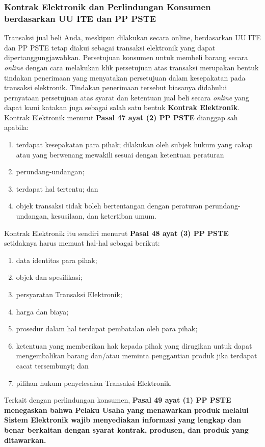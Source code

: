 \subsubsection{Kontrak Elektronik dan Perlindungan Konsumen berdasarkan UU ITE dan PP PSTE}
Transaksi jual beli Anda, meskipun dilakukan secara online, berdasarkan UU ITE dan PP PSTE tetap diakui sebagai transaksi elektronik yang dapat dipertanggungjawabkan. Persetujuan konsumen untuk membeli barang secara \textit{online} dengan cara melakukan klik persetujuan atas transaksi merupakan bentuk tindakan penerimaan yang menyatakan persetujuan dalam kesepakatan pada transaksi elektronik. Tindakan penerimaan tersebut biasanya didahului pernyataan persetujuan atas syarat dan ketentuan jual beli secara \textit{online} yang dapat kami katakan juga sebagai salah satu bentuk \textbf{Kontrak Elektronik}. Kontrak Elektronik menurut \textbf{Pasal 47 ayat (2) PP PSTE} dianggap sah apabila:
\begin{enumerate}[label=\alph*.]
	\item terdapat kesepakatan para pihak;
	dilakukan oleh subjek hukum yang cakap atau yang berwenang mewakili sesuai dengan ketentuan peraturan \item perundang-undangan;
	\item terdapat hal tertentu; dan
	\item objek transaksi tidak boleh bertentangan dengan peraturan perundang-undangan, kesusilaan, dan ketertiban umum.
\end{enumerate}
\indent Kontrak Elektronik itu sendiri menurut \textbf{Pasal 48 ayat (3) PP PSTE} setidaknya harus memuat hal-hal sebagai berikut:
\begin{enumerate}[label=\alph*.]
	\item data identitas para pihak;
	\item objek dan spesifikasi;
	\item persyaratan Transaksi Elektronik;
	\item harga dan biaya;
	\item prosedur dalam hal terdapat pembatalan oleh para pihak;
	\item ketentuan yang memberikan hak kepada pihak yang dirugikan untuk dapat mengembalikan barang dan/atau meminta penggantian produk jika terdapat cacat tersembunyi; dan
	\item pilihan hukum penyelesaian Transaksi Elektronik.
\end{enumerate}
\indent Terkait dengan perlindungan konsumen, \textbf{Pasal 49 ayat (1) PP PSTE menegaskan bahwa Pelaku Usaha yang menawarkan produk melalui Sistem Elektronik wajib menyediakan informasi yang lengkap dan benar berkaitan dengan syarat kontrak, produsen, dan produk yang ditawarkan.}

